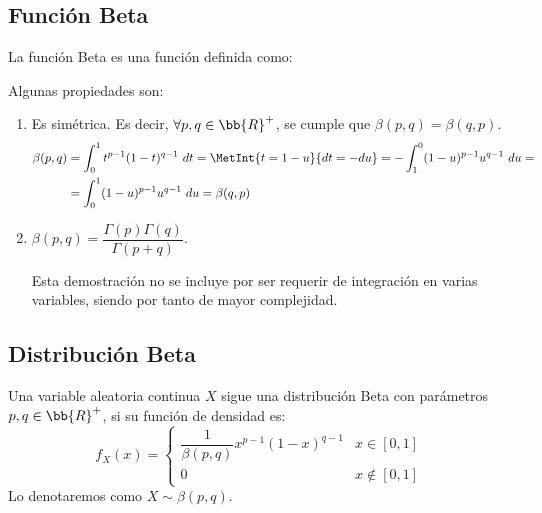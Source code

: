 \subsection{Función Beta}

\begin{definicion}
    La función Beta es una función definida como:
\end{definicion}

Algunas propiedades son:
\begin{enumerate}
    \item Es simétrica. Es decir, $\forall p,q\in \bb{R}^+$, se cumple que $\beta(p,q) = \beta(q,p)$.
    \begin{align*}
        \beta(p,q) &= \int_{0}^{1} t^{p-1}(1-t)^{q-1}~dt
        = \MetInt{t=1-u}{dt=-du}
        = -\int_{1}^{0} (1-u)^{p-1}u^{q-1}~du
        =\\&= \int_{0}^{1} (1-u)^{p-1}u^{q-1}~du
        = \beta(q,p)
    \end{align*}

    \item $\beta(p,q) = \dfrac{\Gamma(p)\Gamma(q)}{\Gamma(p+q)}$.
    
    Esta demostración no se incluye por ser requerir de integración en varias variables, siendo por tanto de mayor complejidad.
\end{enumerate}


\subsection{Distribución Beta}

\begin{definicion}
    Una variable aleatoria continua $X$ sigue una distribución Beta con parámetros $p,q\in \bb{R}^+$,
    si su función de densidad es:
    \begin{equation*}
        f_X(x) = \begin{cases}
            \dfrac{1}{\beta(p,q)}x^{p-1}(1-x)^{q-1} & x\in [0,1]\\
            0 & x\notin [0,1]
        \end{cases}
    \end{equation*}
    Lo denotaremos como $X\sim \beta(p,q)$.
\end{definicion}

